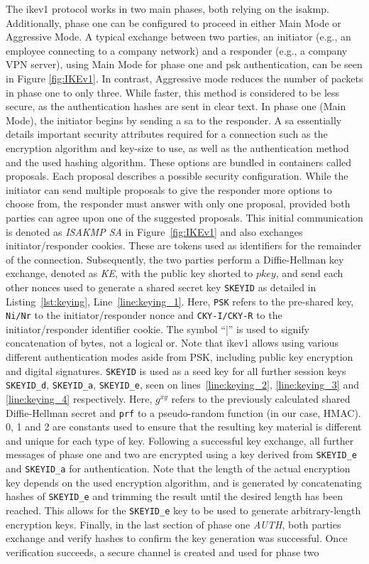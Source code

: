 The \ac{ike}v1 protocol works in two main phases, both relying on the \ac{isakmp}. Additionally, phase one can be configured to proceed in either Main Mode or Aggressive Mode. A typical exchange between two parties, an initiator (e.g., an employee connecting to a company network) and a responder (e.g., a company VPN server), using Main Mode for phase one and \ac{psk} authentication, can be seen in Figure \ref{fig:IKEv1}. In contrast, Aggressive mode reduces the number of packets in phase one to only three. While faster, this method is considered to be less secure, as the authentication hashes are sent in clear text. In phase one (Main Mode), the initiator begins by sending a \ac{sa} to the responder. A \ac{sa} essentially details important security attributes required for a connection such as the encryption algorithm and key-size to use, as well as the authentication method and the used hashing algorithm. These options are bundled in containers called proposals. Each proposal describes a possible security configuration. While the initiator can send multiple proposals to give the responder more options to choose from, the responder must answer with only one proposal, provided both parties can agree upon one of the suggested proposals. This initial communication is denoted as \emph{ISAKMP SA} in Figure~\ref{fig:IKEv1} and also exchanges initiator/responder cookies. These are tokens used as identifiers for the remainder of the connection. Subsequently, the two parties perform a Diffie-Hellman key exchange, denoted as \emph{KE}, with the public key shorted to $pkey$, and send each other nonces used to generate a shared secret key \texttt{SKEYID} as detailed in Listing~\ref{lst:keying}, Line~\ref{line:keying_1}. Here, \texttt{PSK} refers to the pre-shared key, \texttt{Ni/Nr} to the initiator/responder nonce and \texttt{CKY-I/CKY-R} to the initiator/responder identifier cookie. The symbol ``|'' is used to signify concatenation of bytes, not a logical or. Note that \ac{ike}v1 allows using various different authentication modes aside from PSK, including public key encryption and digital signatures. \texttt{SKEYID} is used as a seed key for all further session keys \texttt{SKEYID\_d}, \texttt{SKEYID\_a}, \texttt{SKEYID\_e}, seen on lines~\ref{line:keying_2}, \ref{line:keying_3} and \ref{line:keying_4} respectively. Here, $g^{xy}$ refers to the previously calculated shared Diffie-Hellman secret and \texttt{prf} to a pseudo-random function (in our case, HMAC). 0, 1 and 2 are constants used to ensure that the resulting key material is different and unique for each type of key. Following a successful key exchange, all further messages of phase one and two are encrypted using a key derived from \texttt{SKEYID\_e} and \texttt{SKEYID\_a} for authentication. Note that the length of the actual encryption key depends on the used encryption algorithm, and is generated by concatenating hashes of \texttt{SKEYID\_e} and trimming the result until the desired length has been reached. This allows for the \texttt{SKEYID\_e} key to be used to generate arbitrary-length encryption keys. Finally, in the last section of phase one \emph{AUTH}, both parties exchange and verify hashes to confirm the key generation was successful. Once verification succeeds, a secure channel is created and used for phase two 